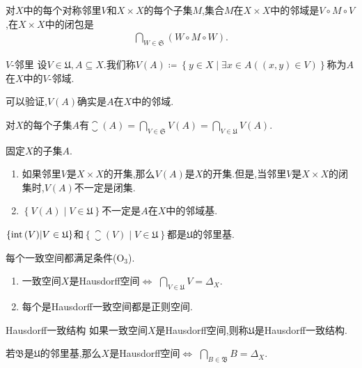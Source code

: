 \begin{proposition}{}{}
	对$X$中的每个对称邻里$V$和$X\times X$的每个子集$M$,集合$M$在$X\times X$中的邻域是$V\circ M\circ V$,在$X\times X$中的闭包是
	\begin{align*}
		\bigcap\limits_{W\in\mathfrak{S}}\left(W\circ M\circ W\right).
	\end{align*}
\end{proposition}

\begin{definition}{$V$-邻里}{}
	设$V\in\mathfrak{U},A\subseteq X$.我们称$V\left(A\right)\coloneq\left\{y\in X\middle|\exists x\in A\left(\left(x,y\right)\in V\right)\right\}$称为$A$在$X$中的$V$-邻域.
\end{definition}

\begin{remark}{}{}
	可以验证,$V\left(A\right)$确实是$A$在$X$中的邻域.
\end{remark}

\begin{proposition}{}{}
	对$X$的每个子集$A$有$\closure\left(A\right)=\bigcap\limits_{V\in\mathfrak{S}}V\left(A\right)=\bigcap\limits_{V\in\mathfrak{U}}V\left(A\right)$.
\end{proposition}

\begin{remark}{}{}
	固定$X$的子集$A$.
	\begin{enumerate}
		\item 如果邻里$V$是$X\times X$的开集,那么$V\left(A\right)$是$X$的开集.但是,当邻里$V$是$X\times X$的闭集时,$V\left(A\right)$不一定是闭集.
		\item $\left\{V\left(A\right)\middle|V\in\mathfrak{U}\right\}$不一定是$A$在$X$中的邻域基.
	\end{enumerate}
\end{remark}

\begin{corollary}{}{}
	$\left\{\operatorname{int}\left(V\right)\middle|V\in\mathfrak{U}\right\}$和$\left\{\closure\left(V\right)\middle|V\in\mathfrak{U}\right\}$都是$\mathfrak{U}$的邻里基.
\end{corollary}

\begin{corollary}{}{}
	每个一致空间都满足条件($\mathrm{O}_{3}$).
\end{corollary}

\begin{proposition}{}{}
	\begin{enumerate}
		\item 一致空间$X$是Hausdorff空间$\iff$ $\bigcap\limits_{V\in\mathfrak{U}}V=\Delta_{X}$.
		\item 每个是Hausdorff一致空间都是正则空间.
	\end{enumerate}
\end{proposition}

\begin{definition}{Hausdorff一致结构}{}
	如果一致空间$X$是Hausdorff空间,则称$\mathfrak{U}$是Hausdorff一致结构.
\end{definition}

\begin{remark}{}{}
	若$\mathfrak{B}$是$\mathfrak{U}$的邻里基,那么$X$是Hausdorff空间$\iff$ $\bigcap\limits_{B\in\mathfrak{B}}B=\Delta_{X}$.
\end{remark}